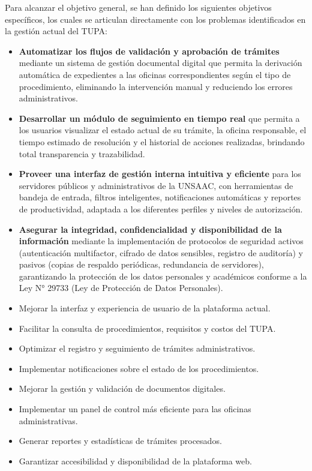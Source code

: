 Para alcanzar el objetivo general, se han definido los siguientes objetivos específicos, los cuales se articulan 
directamente con los problemas identificados en la gestión actual del TUPA:

\begin{itemize}


    \item \textbf{Automatizar los flujos de validación y aprobación de trámites} mediante un sistema de gestión 
    documental digital que permita la derivación automática de expedientes a las oficinas correspondientes según 
    el tipo de procedimiento, eliminando la intervención manual y reduciendo los errores administrativos.

    \item \textbf{Desarrollar un módulo de seguimiento en tiempo real} que permita a los usuarios visualizar el 
    estado actual de su trámite, la oficina responsable, el tiempo estimado de resolución y el historial de 
    acciones realizadas, brindando total transparencia y trazabilidad.

    \item \textbf{Proveer una interfaz de gestión interna intuitiva y eficiente} para los servidores públicos y 
    administrativos de la UNSAAC, con herramientas de bandeja de entrada, filtros inteligentes, notificaciones 
    automáticas y reportes de productividad, adaptada a los diferentes perfiles y niveles de autorización.

    \item \textbf{Asegurar la integridad, confidencialidad y disponibilidad de la información} mediante la 
    implementación de protocolos de seguridad activos (autenticación multifactor, cifrado de datos sensibles, 
    registro de auditoría) y pasivos (copias de respaldo periódicas, redundancia de servidores), garantizando 
    la protección de los datos personales y académicos conforme a la Ley N° 29733 (Ley de Protección de Datos Personales).

    \item Mejorar la interfaz y experiencia de usuario de la plataforma actual.
    \item Facilitar la consulta de procedimientos, requisitos y costos del TUPA.
    \item Optimizar el registro y seguimiento de trámites administrativos.
    \item Implementar notificaciones sobre el estado de los procedimientos.
    \item Mejorar la gestión y validación de documentos digitales.
    \item Implementar un panel de control más eficiente para las oficinas administrativas.
    \item Generar reportes y estadísticas de trámites procesados.
    \item Garantizar accesibilidad y disponibilidad de la plataforma web.
 
\end{itemize}

